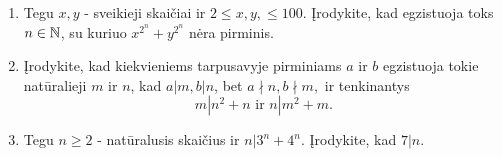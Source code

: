 \begin{enumerate}
  \item \text{[Russia 2009]} Tegu $x,y$ - sveikieji skaičiai ir $2 \leq x,y,
    \leq 100$. Įrodykite, kad egzistuoja toks $n\in \mathbb N$, su kuriuo $x^{2^n}
    + y^{2^n}$ nėra pirminis. 
  \item \text{[INAMO 2009]} Įrodykite, kad kiekvieniems tarpusavyje
    pirminiams $a$ ir $b$ egzistuoja tokie natūralieji $m$ ir $n$, kad
    $a|m, b|n$, bet $a \nmid n, b \nmid m,$ ir tenkinantys 
    $$m|n^2 + n \text{ ir } n|m^2 + m.$$
  \item {} Tegu $n\geq 2$ - natūralusis skaičius ir
    $n|3^n + 4^n$. Įrodykite, kad $7|n$.

\end{enumerate}
